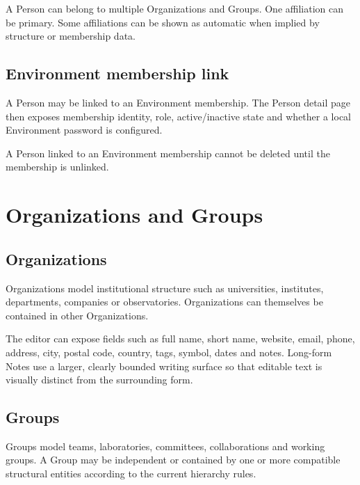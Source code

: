 \documentclass{testudomanual}
\begin{document}
A Person can belong to multiple Organizations and Groups. One affiliation can be primary. Some affiliations can be shown as automatic when implied by structure or membership data.

\section{Environment membership link}

A Person may be linked to an Environment membership. The Person detail page then exposes membership identity, role, active/inactive state and whether a local Environment password is configured.

A Person linked to an Environment membership cannot be deleted until the membership is unlinked.


\chapter{Organizations and Groups}

\section{Organizations}

Organizations model institutional structure such as universities, institutes, departments, companies or observatories. Organizations can themselves be contained in other Organizations.

The editor can expose fields such as full name, short name, website, email, phone, address, city, postal code, country, tags, symbol, dates and notes. Long-form Notes use a larger, clearly bounded writing surface so that editable text is visually distinct from the surrounding form.

\section{Groups}

Groups model teams, laboratories, committees, collaborations and working groups. A Group may be independent or contained by one or more compatible structural entities according to the current hierarchy rules.
\end{document}
